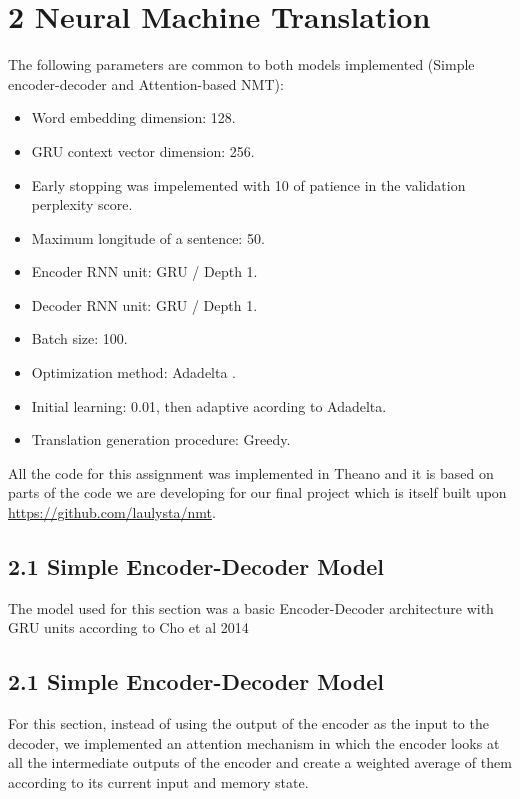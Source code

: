 \documentclass{article}
\begin{document}
{\section{2 Neural Machine Translation}}

The following parameters are common to both models implemented (Simple encoder-decoder and Attention-based NMT):\\

\begin{itemize}
    \item Word embedding dimension: 128.
    \item GRU context vector dimension: 256.
    \item Early stopping was impelemented with 10 of patience in the validation perplexity score. 
    \item Maximum longitude of a sentence: 50.
    \item Encoder RNN unit: GRU / Depth 1.
    \item Decoder RNN unit: GRU / Depth 1.
    \item Batch size: 100.
    \item Optimization method: Adadelta \cite{adadelta}.
    \item Initial learning: 0.01, then adaptive acording to Adadelta.
    \item Translation generation procedure: Greedy.
\end{itemize}

All the code for this assignment was implemented in Theano and it is based on parts of the code we are developing for our final project which is itself built upon \url{https://github.com/laulysta/nmt}. 


{\subsection{2.1 Simple Encoder-Decoder Model}}

The model used for this section was a basic Encoder-Decoder architecture with GRU units according to Cho et al 2014  \cite{cho_encdec} \\





{\subsection{2.1 Simple Encoder-Decoder Model}}

For this section, instead of using the output of the encoder as the input to the decoder, we implemented an attention mechanism in which the encoder looks at all the intermediate outputs of the encoder and create a weighted average of them according to its current input and memory state. \\
\end{document}
